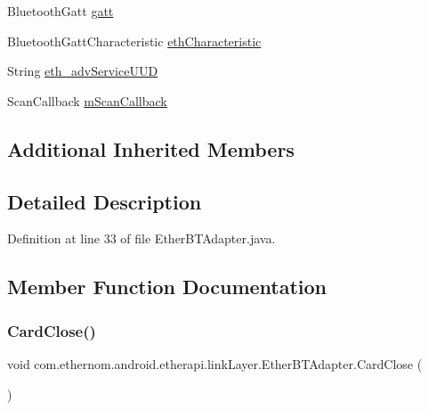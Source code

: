 \begin{DoxyCompactItemize}
\item 
Bluetooth\+Gatt \mbox{\hyperlink{classcom_1_1ethernom_1_1android_1_1etherapi_1_1link_layer_1_1_ether_b_t_adapter_a1961b47ca5197b2b451b9f5fe0b29b2c}{gatt}}
\item 
Bluetooth\+Gatt\+Characteristic \mbox{\hyperlink{classcom_1_1ethernom_1_1android_1_1etherapi_1_1link_layer_1_1_ether_b_t_adapter_a76230973900a1833af4b9198dbf33ae1}{eth\+Characteristic}}
\item 
String \mbox{\hyperlink{classcom_1_1ethernom_1_1android_1_1etherapi_1_1link_layer_1_1_ether_b_t_adapter_a953a712d450d67dfc323a9d0b6f41fc6}{eth\+\_\+adv\+Service\+U\+UD}}
\item 
Scan\+Callback \mbox{\hyperlink{classcom_1_1ethernom_1_1android_1_1etherapi_1_1link_layer_1_1_ether_b_t_adapter_a9b9a03eee47eba66ccd70586afae0c4b}{m\+Scan\+Callback}}
\end{DoxyCompactItemize}
\subsection*{Additional Inherited Members}


\subsection{Detailed Description}


Definition at line 33 of file Ether\+B\+T\+Adapter.\+java.



\subsection{Member Function Documentation}
\mbox{\label{classcom_1_1ethernom_1_1android_1_1etherapi_1_1link_layer_1_1_ether_b_t_adapter_a5fa7afd43aba43e8dc79e831f4ef274d}} 
\subsubsection{\texorpdfstring{Card\+Close()}{CardClose()}}
{\footnotesize\ttfamily void com.\+ethernom.\+android.\+etherapi.\+link\+Layer.\+Ether\+B\+T\+Adapter.\+Card\+Close (\begin{DoxyParamCaption}{ }\end{DoxyParamCaption})}




